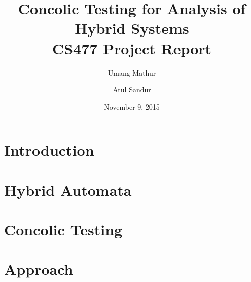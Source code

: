 

\title{Concolic Testing for Analysis of Hybrid Systems  \\
\large CS477 Project Report}
\author{Umang Mathur \and Atul Sandur}
\date{November 9, 2015}



\maketitle

\section{Introduction}



\section{Hybrid Automata}


\section{Concolic Testing}


\section{Approach}





